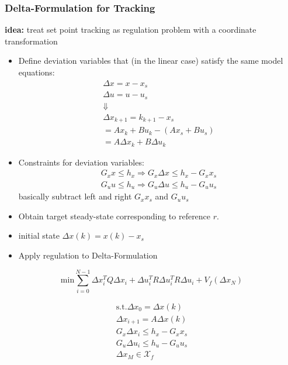 \subsubsection{Delta-Formulation for Tracking}
\textbf{idea:} treat set point tracking as regulation problem with a coordinate transformation
\begin{itemize}
    \item Define deviation variables that (in the linear case) satisfy the same model equations:
    \begin{gather*}
        \Delta x = x-x_s\\ 
        \Delta u =u-u_s\\
        \Downarrow\\
        \Delta x_{k+1} = k_{k+1} -x_s \\
        = Ax_k + Bu_k - (Ax_s+Bu_s)\\
        = A \Delta x_k+ B \Delta u_k
    \end{gather*}
    \item Constraints for deviation variables: 
    \begin{gather*}
        G_xx\leq h_x \Rightarrow G_x\Delta x \leq h_x - G_x x_s \\
        G_uu\leq h_u \Rightarrow G_u \Delta u \leq h_u - G_u u_s 
    \end{gather*}
    basically subtract left and right $G_x x_s $ and $G_u u_s$
    \item Obtain target steady-state corresponding to reference $r$. 
    \item initial state $\Delta x(k) = x(k) - x_s$
    \item Apply regulation to Delta-Formulation
\end{itemize}
    \[\mathrm{min} \sum^{N-1}_{i=0} \Delta x_i^T Q \Delta x_i + \Delta u_i^TR \Delta u_i^T R \Delta u_i + V_f (\Delta x_N)\]
\begin{minipage}{0.49\linewidth}
\begin{gather*}
    \mathrm{s.t.} \Delta x_0 = \Delta x(k)\\
    \Delta x_{i+1}= A \Delta x(k)\\
    G_x\Delta x_i \leq h_x -G_xx_s \\ 
    G_u \Delta u_i \leq h_u -G_u u_s \\
    \Delta x_M \in \mathcal{X}_f
\end{gather*}
\end{minipage}
